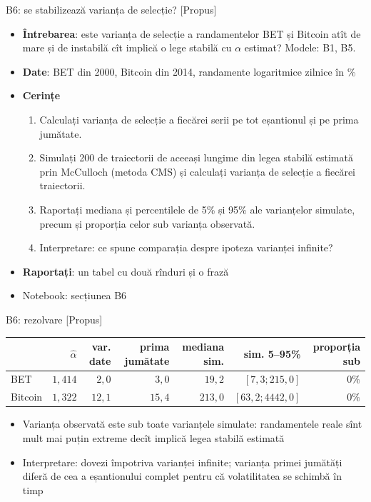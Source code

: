 \begin{frame}{B6: se stabilizează varianța de selecție? [Propus]}
\itemsize{\footnotesize}
\begin{itemize}
\item \textbf{Întrebarea}: este varianța de selecție a randamentelor BET și Bitcoin atît de mare și de instabilă cît implică o lege stabilă cu $\alpha$ estimat? Modele: B1, B5.
\item \textbf{Date}: BET din 2000, Bitcoin din 2014, randamente logaritmice zilnice în \%
\item \textbf{Cerințe}
\begin{enumerate}
    \item Calculați varianța de selecție a fiecărei serii pe tot eșantionul și pe prima jumătate.
    \item Simulați 200 de traiectorii de aceeași lungime din legea stabilă estimată prin McCulloch (metoda CMS) și calculați varianța de selecție a fiecărei traiectorii.
    \item Raportați mediana și percentilele de 5\% și 95\% ale varianțelor simulate, precum și proporția celor sub varianța observată.
    \item Interpretare: ce spune comparația despre ipoteza varianței infinite?
\end{enumerate}
\item \textbf{Raportați}: un tabel cu două rînduri și o frază
\item Notebook: secțiunea B6
\end{itemize}
\end{frame}

\ifsolutions
\begin{frame}{B6: rezolvare [Propus]}
\itemsize{\footnotesize}
\begin{center}
\footnotesize
\begin{tabular}{lrrrrrr}
\toprule
& $\hat\alpha$ & var. date & prima jumătate & mediana sim. & sim. 5--95\% & proporția sub \\
\midrule
BET & $1{,}414$ & $2{,}0$ & $3{,}0$ & $19{,}2$ & $[7{,}3; 215{,}0]$ & $0\%$ \\
Bitcoin & $1{,}322$ & $12{,}1$ & $15{,}4$ & $213{,}0$ & $[63{,}2; 4442{,}0]$ & $0\%$ \\
\bottomrule
\end{tabular}
\end{center}
\begin{itemize}
    \item Varianța observată este sub toate varianțele simulate: randamentele reale sînt mult mai puțin extreme decît implică legea stabilă estimată
    \item Interpretare: dovezi împotriva varianței infinite; varianța primei jumătăți diferă de cea a eșantionului complet pentru că volatilitatea se schimbă în timp
\end{itemize}
\end{frame}
\fi


